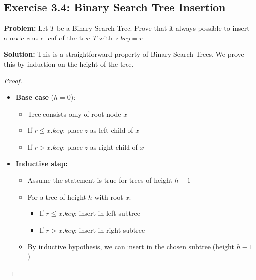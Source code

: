 \subsection{Exercise 3.4: Binary Search Tree Insertion}
\textbf{Problem:} Let $T$ be a Binary Search Tree. Prove that it always possible to insert a node $z$ as a leaf of the tree $T$ with $z.key = r$.

\textbf{Solution:} This is a straightforward property of Binary Search Trees. We prove this by induction on the height of the tree.

\begin{proof}
\begin{itemize}
\item \textbf{Base case} ($h = 0$):
    \begin{itemize}
        \item Tree consists only of root node $x$
        \item If $r \leq x.key$: place $z$ as left child of $x$
        \item If $r > x.key$: place $z$ as right child of $x$
    \end{itemize}

\item \textbf{Inductive step:}
    \begin{itemize}
        \item Assume the statement is true for trees of height $h-1$
        \item For a tree of height $h$ with root $x$:
        \begin{itemize}
            \item If $r \leq x.key$: insert in left subtree
            \item If $r > x.key$: insert in right subtree
        \end{itemize}
        \item By inductive hypothesis, we can insert in the chosen subtree (height $h-1$)
    \end{itemize}
\end{itemize}
\end{proof}

